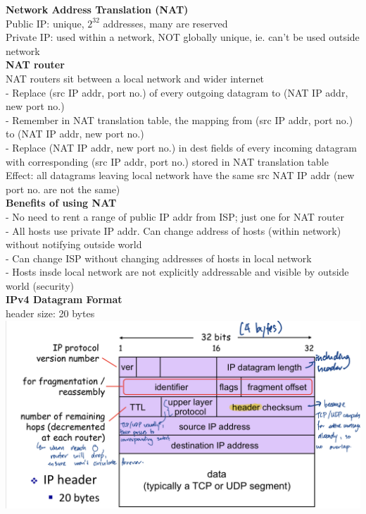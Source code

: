 \documentclass[10pt, a4paper]{article}
\newcommand{\blue}[1]{{\color{MidnightBlue}#1}}
\newcommand{\red}[1]{{\color{red}#1}}
\newcommand{\green}[1]{{\color{ForestGreen}#1}}
\begin{document}
\begin{multicols*}{3}
		\textbf{Network Address Translation (NAT)}\\
		Public IP: unique, $2^{32}$ addresses, many are reserved\\
		Private IP: used within a network, \red{NOT} globally unique, ie. can't be used outside network\\

		\textbf{NAT router}\\
		NAT routers sit between a local network and wider internet\\
		- \blue{Replace} (src IP addr, port no.) of \red{every outgoing datagram} to (NAT IP addr, new port no.)\\
		- \blue{Remember} in NAT translation table, the mapping from (src IP addr, port no.) to (NAT IP addr, new port no.)\\
		- \blue{Replace} (NAT IP addr, new port no.) in dest fields of every \blue{incoming datagram} with corresponding (src IP addr, port no.) stored in NAT translation table\\
		\green{Effect:} \red{all} datagrams \red{leaving} local network have the same src NAT IP addr (new port no. are not the same)\\

		\textbf{Benefits of using NAT}\\
		- No need to rent a range of public IP addr from ISP; just one for NAT router\\
		- All hosts use private IP addr. Can change address of hosts (within network) without notifying outside world\\
		- Can change ISP without changing addresses of hosts in local network\\
		- Hosts insde local network are not explicitly addressable and visible by outside world (security)\\

		\textbf{IPv4 Datagram Format}\\
		header size: 20 \blue{bytes}\\
		\includegraphics[scale=.14]{./assets/ipDatagram}


\end{multicols*}
\end{document}
